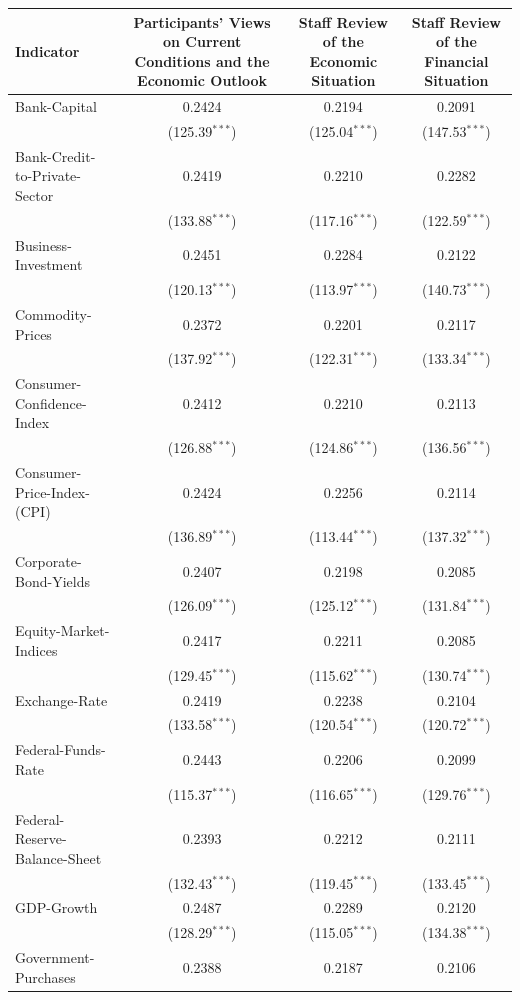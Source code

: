 \begin{tabular}{lccc}
\hline
Indicator & Participants' Views on Current Conditions and the Economic Outlook & Staff Review of the Economic Situation & Staff Review of the Financial Situation \\
\hline
Bank-Capital & 0.2424 & 0.2194 & 0.2091 \\
 & (125.39$^{***}$) & (125.04$^{***}$) & (147.53$^{***}$) \\
Bank-Credit-to-Private-Sector & 0.2419 & 0.2210 & 0.2282 \\
 & (133.88$^{***}$) & (117.16$^{***}$) & (122.59$^{***}$) \\
Business-Investment & 0.2451 & 0.2284 & 0.2122 \\
 & (120.13$^{***}$) & (113.97$^{***}$) & (140.73$^{***}$) \\
Commodity-Prices & 0.2372 & 0.2201 & 0.2117 \\
 & (137.92$^{***}$) & (122.31$^{***}$) & (133.34$^{***}$) \\
Consumer-Confidence-Index & 0.2412 & 0.2210 & 0.2113 \\
 & (126.88$^{***}$) & (124.86$^{***}$) & (136.56$^{***}$) \\
Consumer-Price-Index-(CPI) & 0.2424 & 0.2256 & 0.2114 \\
 & (136.89$^{***}$) & (113.44$^{***}$) & (137.32$^{***}$) \\
Corporate-Bond-Yields & 0.2407 & 0.2198 & 0.2085 \\
 & (126.09$^{***}$) & (125.12$^{***}$) & (131.84$^{***}$) \\
Equity-Market-Indices & 0.2417 & 0.2211 & 0.2085 \\
 & (129.45$^{***}$) & (115.62$^{***}$) & (130.74$^{***}$) \\
Exchange-Rate & 0.2419 & 0.2238 & 0.2104 \\
 & (133.58$^{***}$) & (120.54$^{***}$) & (120.72$^{***}$) \\
Federal-Funds-Rate & 0.2443 & 0.2206 & 0.2099 \\
 & (115.37$^{***}$) & (116.65$^{***}$) & (129.76$^{***}$) \\
Federal-Reserve-Balance-Sheet & 0.2393 & 0.2212 & 0.2111 \\
 & (132.43$^{***}$) & (119.45$^{***}$) & (133.45$^{***}$) \\
GDP-Growth & 0.2487 & 0.2289 & 0.2120 \\
 & (128.29$^{***}$) & (115.05$^{***}$) & (134.38$^{***}$) \\
Government-Purchases & 0.2388 & 0.2187 & 0.2106 \\

\end{tabular}
